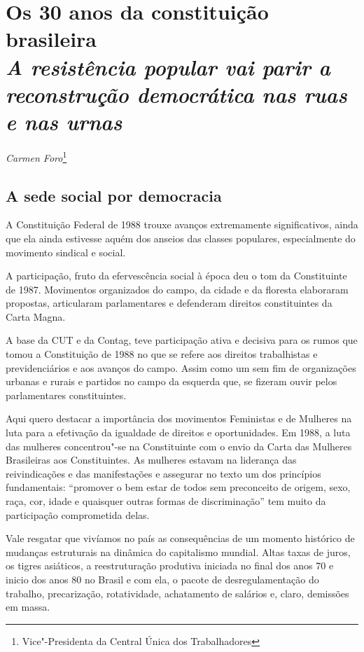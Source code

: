\chapter{Os 30 anos da constituição brasileira\\
\emph{A resistência popular vai parir a reconstrução democrática nas
ruas e nas urnas}}

\begin{flushright}
\emph{Carmen Foro}\footnote{Vice"-Presidenta da Central Única dos Trabalhadores}
\end{flushright}

\section{A sede social por democracia}

A Constituição Federal de 1988 trouxe avanços extremamente
significativos, ainda que ela ainda estivesse aquém dos anseios das
classes populares, especialmente do movimento sindical e social.

A participação, fruto da efervescência social à época deu o tom da
Constituinte de 1987. Movimentos organizados do campo, da cidade e da
floresta elaboraram propostas, articularam parlamentares e defenderam
direitos constituintes da Carta Magna.

A base da CUT e da Contag, teve participação ativa e decisiva para os
rumos que tomou a Constituição de 1988 no que se refere aos direitos
trabalhistas e previdenciários e aos avanços do campo. Assim como um sem
fim de organizações urbanas e rurais e partidos no campo da esquerda
que, se fizeram ouvir pelos parlamentares constituintes.

Aqui quero destacar a importância dos movimentos Feministas e de
Mulheres na luta para a efetivação da igualdade de direitos e
oportunidades. Em 1988, a luta das mulheres concentrou"-se na
Constituinte com o envio da Carta das Mulheres Brasileiras aos
Constituintes. As mulheres estavam na liderança das reivindicações e das
manifestações e assegurar no texto um dos princípios fundamentais:
``promover o bem estar de todos sem preconceito de origem, sexo, raça,
cor, idade e quaisquer outras formas de discriminação'' tem muito da
participação comprometida delas.

Vale resgatar que vivíamos no país as consequências de um momento
histórico de mudanças estruturais na dinâmica do capitalismo mundial.
Altas taxas de juros, os tigres asiáticos, a reestruturação produtiva
iniciada no final dos anos 70 e inicio dos anos 80 no Brasil e com ela,
o pacote de desregulamentação do trabalho, precarização, rotatividade,
achatamento de salários e, claro, demissões em massa.

